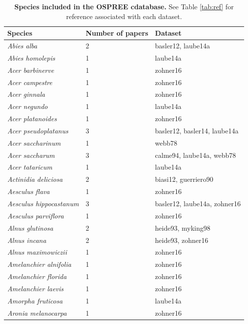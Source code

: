 \documentclass{article}
\begin{document}
\begin{footnotesize}
\begin{longtable}{p{}p{}p{}}
\caption{\textbf{Species included in the OSPREE cdatabase.} See Table \ref{tab:ref} for reference associated with each dataset.} \\ 
  \hline
Species & Number of papers & Dataset \\ 
  \hline \endhead  \hline
\textit{Abies alba} &   2 & basler12, laube14a \\ 
  \textit{Abies homolepis} &   1 & laube14a \\ 
  \textit{Acer barbinerve} &   1 & zohner16 \\ 
  \textit{Acer campestre} &   1 & zohner16 \\ 
  \textit{Acer ginnala} &   1 & zohner16 \\ 
  \textit{Acer negundo} &   1 & laube14a \\ 
  \textit{Acer platanoides} &   1 & zohner16 \\ 
  \textit{Acer pseudoplatanus} &   3 & basler12, basler14, laube14a \\ 
  \textit{Acer saccharinum} &   1 & webb78 \\ 
  \textit{Acer saccharum} &   3 & calme94, laube14a, webb78 \\ 
  \textit{Acer tataricum} &   1 & laube14a \\ 
  \textit{Actinidia deliciosa} &   2 & biasi12, guerriero90 \\ 
  \textit{Aesculus flava} &   1 & zohner16 \\ 
  \textit{Aesculus hippocastanum} &   3 & basler12, laube14a, zohner16 \\ 
  \textit{Aesculus parviflora} &   1 & zohner16 \\ 
  \textit{Alnus glutinosa} &   2 & heide93, myking98 \\ 
  \textit{Alnus incana} &   2 & heide93, zohner16 \\ 
  \textit{Alnus maximowiczii} &   1 & zohner16 \\ 
  \textit{Amelanchier alnifolia} &   1 & zohner16 \\ 
  \textit{Amelanchier florida} &   1 & zohner16 \\ 
  \textit{Amelanchier laevis} &   1 & zohner16 \\ 
  \textit{Amorpha fruticosa} &   1 & laube14a \\ 
  \textit{Aronia melanocarpa} &   1 & zohner16 \\ 

\end{longtable}
\end{footnotesize}
\end{document}
